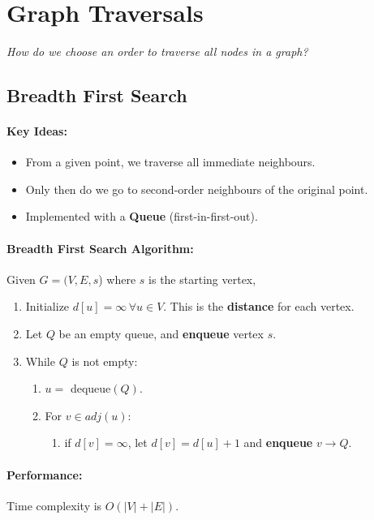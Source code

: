 \documentclass[a4paper,12pt]{report}
\begin{document}
\section{Graph Traversals}

\textit{How do we choose an order to traverse all nodes in a graph?} 

\subsection{Breadth First Search}

\paragraph{Key Ideas: } 
\begin{itemize}
\item From a given point, we traverse all immediate neighbours. 
\item Only then do we go to second-order neighbours of the original point.
\item Implemented with a \textbf{Queue} (first-in-first-out).
\end{itemize}

\paragraph{Breadth First Search Algorithm: } Given $G=(V,E,s$) where $s$ is the starting vertex,
\begin{enumerate}
\item Initialize $d[u] = \infty\,\forall u\in V$. This is the \textbf{distance} for each vertex.
\item Let $Q$ be an empty queue, and \textbf{enqueue} vertex $s$.
\item While $Q$ is not empty:
\begin{enumerate}
\item $u = $ dequeue$(Q)$.
\item For $v\in adj(u)$:
\begin{enumerate}
\item if $d[v] = \infty$, let $d[v] = d[u]+1$ and \textbf{enqueue} $v\to Q$.
\end{enumerate}
\end{enumerate}
\end{enumerate}

\paragraph{Performance: } Time complexity is $O(|V|+|E|)$.
\end{document}
